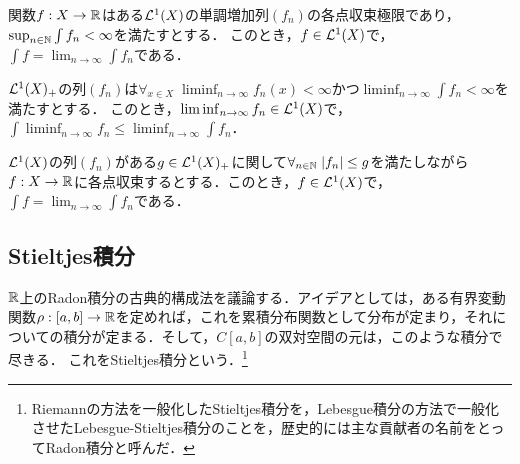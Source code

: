 \documentclass[uplatex,dvipdfmx]{jsreport}
\begin{document}
\begin{theorem}
    関数$f:X\to\mathbb{R}$はある$\mathcal{L}^1(X)$の単調増加列$(f_n)$の各点収束極限であり，$\sup_{n\in\mathbb{N}}\int f_n<\infty$を満たすとする．
    このとき，$f\in\mathcal{L}^1(X)$で，$\int f=\lim_{n\to\infty}\int f_n$である．
\end{theorem}

\begin{lemma}
    $\mathcal{L}^1(X)_+$の列$(f_n)$は$\forall_{x\in X}\;\liminf_{n\to\infty}f_n(x)<\infty$かつ$\liminf_{n\to\infty}\int f_n<\infty$を満たすとする．
    このとき，$\liminf_{n\to\infty}f_n\in\mathcal{L}^1(X)$で，$\int\liminf_{n\to\infty}f_n\le\liminf_{n\to\infty}\int f_n$．
\end{lemma}

\begin{theorem}
    $\mathcal{L}^1(X)$の列$(f_n)$がある$g\in\mathcal{L}^1(X)_+$に関して$\forall_{n\in\mathbb{N}}\;\lvert f_n\rvert\le g$を満たしながら
    $f:X\to\mathbb{R}$に各点収束するとする．このとき，$f\in\mathcal{L}^1(X)$で，$\int f=\lim_{n\to\infty}\int f_n$である．
\end{theorem}

\subsection{Stieltjes積分}

\begin{tcolorbox}[colframe=ForestGreen, colback=ForestGreen!10!white,breakable,colbacktitle=ForestGreen!40!white,coltitle=black,fonttitle=\bfseries\sffamily,
title=]
    $\mathbb{R}$上のRadon積分の古典的構成法を議論する．アイデアとしては，ある有界変動関数$\rho:[a,b]\to\mathbb{R}$を定めれば，これを累積分布関数として分布が定まり，それについての積分が定まる．そして，$C[a,b]$の双対空間の元は，このような積分で尽きる．
    これをStieltjes積分という．\footnote{Riemannの方法を一般化したStieltjes積分を，Lebesgue積分の方法で一般化させたLebesgue-Stieltjes積分のことを，歴史的には主な貢献者の名前をとってRadon積分と呼んだ．}
\end{tcolorbox}
\end{document}
